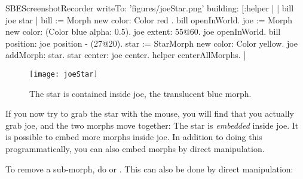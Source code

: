 \documentclass[a4paper,10pt,twoside]{book}
\begin{document}
\begin{ExecuteSmalltalkScript}
SBEScreenshotRecorder writeTo: 'figures/joeStar.png' building: [:helper |
	| bill joe star |
	bill := Morph new color: Color red .
	bill openInWorld.
	joe := Morph new color: (Color blue alpha: 0.5).
	joe extent: 55@60.
	joe openInWorld.
	bill position: joe position - (27@20).
	star := StarMorph new color: Color yellow.
	joe addMorph: star.
	star center: joe center.
	helper centerAllMorphs.
]
\end{ExecuteSmalltalkScript}
\begin{figure}[ht]
	\centerline{\texttt{[image: joeStar]}}
	\caption{The star is contained inside joe, the translucent blue morph.
		\label{fig:joeStar}}
\end{figure}

If you now try to grab the star with the mouse, you will find that you actually grab joe, and the two morphs move together:
The star is \emph{embedded} inside joe.
It is possible to embed more morphs inside joe.
In addition to doing this programmatically, you can also embed morphs by direct manipulation.



To remove a sub-morph, do    or  .
This can also be done by direct manipulation:

\end{document}
